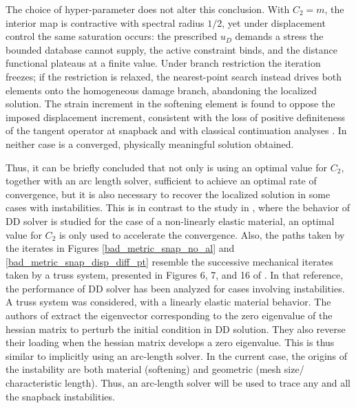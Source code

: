 \documentclass[10pt]{cas-sc}
\begin{document}
\begin{deletedblock}
	The choice of hyper-parameter does not alter this conclusion. With $C_2 = m$, the interior map is contractive with spectral radius $1/2$, yet under displacement control the same saturation occurs: the prescribed $u_D$ demands a stress the bounded database cannot supply, the active constraint binds, and the distance functional plateaus at a finite value. Under branch restriction the iteration freezes; if the restriction is relaxed, the nearest-point search instead drives both elements onto the homogeneous damage branch, abandoning the localized solution. The strain increment in the softening element is found to oppose the imposed displacement increment, consistent with the loss of positive definiteness of the tangent operator at snapback and with classical continuation analyses \cite{deBorst1986,deBorst1987b,Baldelli2021}. In neither case is a converged, physically meaningful solution obtained.	
\end{deletedblock}
\begin{deletedblock}	
	Thus, it can be briefly concluded that not only is using an optimal value for $C_2$, together with an arc length solver, sufficient to achieve an optimal rate of convergence, but it is also necessary to recover the localized solution in some cases with instabilities. This is in contrast to the study in \cite{Nguyen2022}, where the behavior of DD solver is studied for the case of a non-linearly elastic material, an optimal value for $C_2$ is only used to accelerate the convergence. Also, the paths taken by the iterates in Figures \ref{bad_metric_snap_no_al} and \ref{bad_metric_snap_disp_diff_pt} resemble the successive mechanical iterates taken by a truss system, presented in Figures 6, 7, and 16 of \cite{Kuang2023}. In that reference, the performance of DD solver has been analyzed for cases involving instabilities. A truss system was considered, with a linearly elastic material behavior. The authors of \cite{Kuang2023} extract the eigenvector corresponding to the zero eigenvalue of the hessian matrix to perturb the initial condition in DD solution. They also reverse their loading when the hessian matrix develops a zero eigenvalue. This is thus similar to implicitly using an arc-length solver. In the current case, the origins of the instability are both material (softening) and geometric (mesh size/ characteristic length). Thus, an arc-length solver will be used to trace any and all the  snapback instabilities.
\end{deletedblock}
\end{document}
